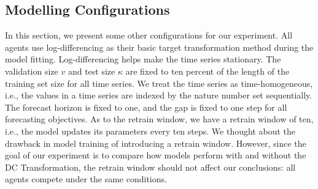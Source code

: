 \subsection{Modelling Configurations}
In this section, we present some other configurations for our experiment. All agents use log-differencing as their basic target transformation method during the model fitting. Log-differencing helps make the time series stationary. The validation size $v$ and test size $\kappa$ are fixed to ten percent of the length of the training set size for all time series. We treat the time series as time-homogeneous, i.e., the values in a time series are indexed by the nature number set sequentially. The forecast horizon is fixed to one, and the gap is fixed to one step for all forecasting objectives. As to the retrain window, we have a retrain window of ten, i.e., the model updates its parameters every ten steps. We thought about the drawback in model training of introducing a retrain window. However, since the goal of our experiment is to compare how models perform with and without the DC Transformation, the retrain window should not affect our conclusions: all agents compete under the same conditions.
